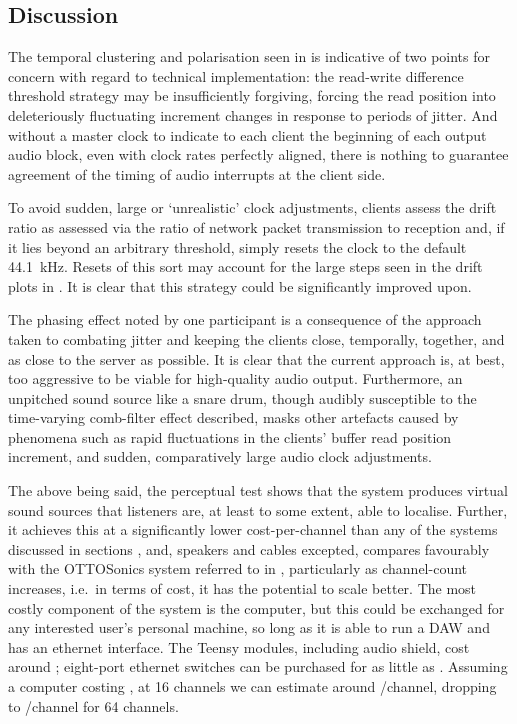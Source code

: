 \subsection{Discussion}\label{subsec:discussion}

The temporal clustering and polarisation seen in
 is indicative of two points for
concern with regard to technical implementation:
the read-write difference threshold strategy may be insufficiently forgiving,
forcing the read position into deleteriously fluctuating increment changes in
response to periods of jitter.
And without a master clock to indicate to each client the beginning of each
output audio block, even with clock rates perfectly aligned, there is nothing
to guarantee agreement of the timing of audio interrupts at the client side.

To avoid sudden, large or `unrealistic' clock adjustments, clients assess
the drift ratio as assessed via the ratio of network packet
transmission to reception and, if it lies beyond an arbitrary threshold,
simply resets the clock to the default \qty{44.1}{\kHz}.
Resets of this sort may account for the large steps seen in the drift plots
in .
It is clear that this strategy could be significantly improved upon.

The phasing effect noted by one participant is a  consequence of the approach
taken to combating jitter and keeping the clients close, temporally, together,
and as close to the server as possible.
It is clear that the current approach is, at best, too aggressive to be viable
for high-quality audio output.
Furthermore, an unpitched sound source like a snare drum, though audibly
susceptible to the time-varying comb-filter effect described, masks other
artefacts caused by phenomena such as rapid fluctuations in the clients' buffer
read position increment, and sudden, comparatively large audio clock
adjustments.

The above being said, the perceptual test shows that the system produces virtual
sound sources that listeners are, at least to some extent, able to localise.
Further, it achieves this at a significantly lower cost-per-channel than any of
the systems discussed in sections , and, speakers
and cables excepted, compares favourably with the OTTOSonics system referred to
in , particularly as channel-count
increases, i.e.\ in terms of cost, it has the potential to scale better.
The most costly component of the system is the computer, but this could be
exchanged for any interested user's personal machine, so long as it is able to
run a DAW and has an ethernet interface.
The Teensy modules, including audio shield, cost around ;
eight-port ethernet switches can be purchased for as little as .
Assuming a computer costing , at 16 channels we can estimate
around /channel, dropping to /channel for 64
channels.
